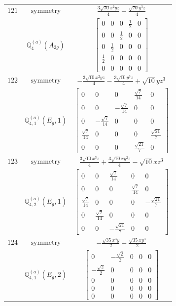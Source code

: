 \documentclass[fleqn,8pt,landscape]{jsarticle}
\begin{document}
\begin{longtable}{ccc}
$ 121 $ & $ \text{symmetry} $ & $ \frac{3 \sqrt{70} x^{2} y z}{4} - \frac{\sqrt{70} y^{3} z}{4} $ \\
$  $ & $ \mathbb{Q}_{4}^{(a)}(A_{2g}) $ & $ \begin{bmatrix} 0 & 0 & 0 & \frac{1}{2} & 0 \\ 0 & 0 & \frac{1}{2} & 0 & 0 \\ 0 & \frac{1}{2} & 0 & 0 & 0 \\ \frac{1}{2} & 0 & 0 & 0 & 0 \\ 0 & 0 & 0 & 0 & 0 \end{bmatrix} $ \\ \hline
$ 122 $ & $ \text{symmetry} $ & $ - \frac{3 \sqrt{10} x^{2} y z}{4} - \frac{3 \sqrt{10} y^{3} z}{4} + \sqrt{10} y z^{3} $ \\
$  $ & $ \mathbb{Q}_{4,1}^{(a)}(E_{g},1) $ & $ \begin{bmatrix} 0 & 0 & 0 & \frac{\sqrt{7}}{14} & 0 \\ 0 & 0 & - \frac{\sqrt{7}}{14} & 0 & 0 \\ 0 & - \frac{\sqrt{7}}{14} & 0 & 0 & 0 \\ \frac{\sqrt{7}}{14} & 0 & 0 & 0 & \frac{\sqrt{21}}{7} \\ 0 & 0 & 0 & \frac{\sqrt{21}}{7} & 0 \end{bmatrix} $ \\ \hline
$ 123 $ & $ \text{symmetry} $ & $ \frac{3 \sqrt{10} x^{3} z}{4} + \frac{3 \sqrt{10} x y^{2} z}{4} - \sqrt{10} x z^{3} $ \\
$  $ & $ \mathbb{Q}_{4,2}^{(a)}(E_{g},1) $ & $ \begin{bmatrix} 0 & 0 & \frac{\sqrt{7}}{14} & 0 & 0 \\ 0 & 0 & 0 & \frac{\sqrt{7}}{14} & 0 \\ \frac{\sqrt{7}}{14} & 0 & 0 & 0 & - \frac{\sqrt{21}}{7} \\ 0 & \frac{\sqrt{7}}{14} & 0 & 0 & 0 \\ 0 & 0 & - \frac{\sqrt{21}}{7} & 0 & 0 \end{bmatrix} $ \\ \hline
$ 124 $ & $ \text{symmetry} $ & $ - \frac{\sqrt{35} x^{3} y}{2} + \frac{\sqrt{35} x y^{3}}{2} $ \\
$  $ & $ \mathbb{Q}_{4,1}^{(a)}(E_{g},2) $ & $ \begin{bmatrix} 0 & - \frac{\sqrt{2}}{2} & 0 & 0 & 0 \\ - \frac{\sqrt{2}}{2} & 0 & 0 & 0 & 0 \\ 0 & 0 & 0 & 0 & 0 \\ 0 & 0 & 0 & 0 & 0 \\ 0 & 0 & 0 & 0 & 0 \end{bmatrix} $ \\ \hline

\end{longtable}
\end{document}
